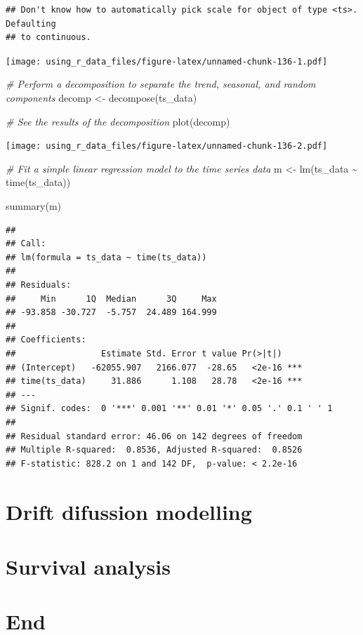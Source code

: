 \documentclass[
]{book}
\newenvironment{Shaded}{\begin{snugshade}}{\end{snugshade}}
\newcommand{\CommentTok}[1]{\textcolor[rgb]{0.56,0.35,0.01}{\textit{#1}}}
\newcommand{\FunctionTok}[1]{\textcolor[rgb]{0.00,0.00,0.00}{#1}}
\newcommand{\NormalTok}[1]{#1}
\newcommand{\OtherTok}[1]{\textcolor[rgb]{0.56,0.35,0.01}{#1}}
\newcommand{\SpecialCharTok}[1]{\textcolor[rgb]{0.00,0.00,0.00}{#1}}
\begin{document}
\begin{verbatim}
## Don't know how to automatically pick scale for object of type <ts>. Defaulting
## to continuous.
\end{verbatim}

\texttt{[image: using\_r\_data\_files/figure-latex/unnamed-chunk-136-1.pdf]}

\begin{Shaded}
\begin{Highlighting}[]
\CommentTok{\# Perform a decomposition to separate the trend, seasonal, and random components}
\NormalTok{decomp }\OtherTok{\textless{}{-}} \FunctionTok{decompose}\NormalTok{(ts\_data)}

\CommentTok{\# See the results of the decomposition}
\FunctionTok{plot}\NormalTok{(decomp)}
\end{Highlighting}
\end{Shaded}

\texttt{[image: using\_r\_data\_files/figure-latex/unnamed-chunk-136-2.pdf]}

\begin{Shaded}
\begin{Highlighting}[]
\CommentTok{\# Fit a simple linear regression model to the time series data}
\NormalTok{m }\OtherTok{\textless{}{-}} \FunctionTok{lm}\NormalTok{(ts\_data }\SpecialCharTok{\textasciitilde{}} \FunctionTok{time}\NormalTok{(ts\_data))}

\FunctionTok{summary}\NormalTok{(m)}
\end{Highlighting}
\end{Shaded}

\begin{verbatim}
## 
## Call:
## lm(formula = ts_data ~ time(ts_data))
## 
## Residuals:
##     Min      1Q  Median      3Q     Max 
## -93.858 -30.727  -5.757  24.489 164.999 
## 
## Coefficients:
##                 Estimate Std. Error t value Pr(>|t|)    
## (Intercept)   -62055.907   2166.077  -28.65   <2e-16 ***
## time(ts_data)     31.886      1.108   28.78   <2e-16 ***
## ---
## Signif. codes:  0 '***' 0.001 '**' 0.01 '*' 0.05 '.' 0.1 ' ' 1
## 
## Residual standard error: 46.06 on 142 degrees of freedom
## Multiple R-squared:  0.8536, Adjusted R-squared:  0.8526 
## F-statistic: 828.2 on 1 and 142 DF,  p-value: < 2.2e-16
\end{verbatim}

\hypertarget{drift-difussion-modelling}{%
\section{Drift difussion modelling}\label{drift-difussion-modelling}}

\hypertarget{survival-analysis}{%
\section{Survival analysis}\label{survival-analysis}}

\hypertarget{end-2}{%
\section{End}\label{end-2}}

  
\end{document}
